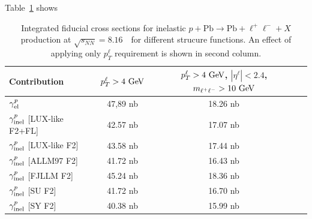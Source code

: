 Table~\ref{tab:kt} shows



\begin{table}[t]
\centering
\begin{tabular}{|l|c|c|c|}
\hline
Contribution  &  $p_{T}^{\ell}>4~\text{Ge\kern -0.1em V}$ & $p_{T}^{\ell}>4~\text{Ge\kern -0.1em V}$, $|\eta^{\ell}|<2.4 $, $m_{\ell^+\ell^-}>10~\text{Ge\kern -0.1em V}$ \\
\hline
$\gamma^{p}_{\rm{el}}$   & 47,89 nb  & 18.26 nb \\
\hline
$\gamma^{p}_{\rm{inel}}$ [LUX-like  F2+FL]  & 42.57 nb    & 17.07 nb\\
\hline
$\gamma^{p}_{\rm{inel}}$ [LUX-like  F2]  & 43.58 nb  &  17.44 nb\\
\hline    
$\gamma^{p}_{\rm{inel}}$ [ALLM97 F2]  & 41.72 nb   &16.43 nb\\
\hline
$\gamma^{p}_{\rm{inel}}$ [FJLLM F2]  & 45.24 nb  &18.36 nb\\
\hline
$\gamma^{p}_{\rm{inel}}$ [SU F2]  & 41.72  nb &16.70 nb\\
\hline 
$\gamma^{p}_{\rm{inel}}$ [SY F2]  & 40.38  nb  &15.99 nb\\
\hline
\end{tabular}
\caption{Integrated fiducial cross sections for inelastic $p+\textrm{Pb}\rightarrow \textrm{Pb} + \ell^+\ell^- + X$ production at $\sqrt{s_{N N}} = 8.16$~\TeV\ for different strucure functions. 
An effect of applying only $p_T^{\ell}$ requirement is shown in second column.
}
\label{tab:kt}
\end{table}





